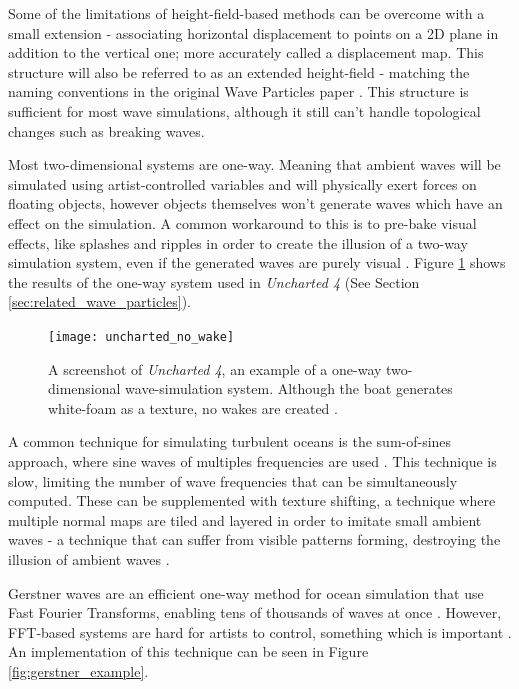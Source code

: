 \documentclass[12pt,a4paper,twoside]{report}
\begin{document}
Some of the limitations of height-field-based methods can be overcome with a
small extension - associating horizontal displacement to points on a 2D plane
in addition to the vertical one; more accurately called a displacement map.
This structure will also be referred to as an extended height-field - matching
the naming conventions in the original Wave Particles paper \cite{Yuksel2007}.
This structure is sufficient for most wave simulations, although it still can't
handle topological changes such as breaking waves.

Most two-dimensional systems are one-way. Meaning that ambient waves will be
simulated using artist-controlled variables and will physically exert forces on
floating objects, however objects themselves won't generate waves which have an
effect on the simulation. A common workaround to this is to pre-bake visual
effects, like splashes and ripples in order to create the illusion of a two-way
simulation system, even if the generated waves are purely visual \cite{RTR3}.
Figure \ref{fig:uncharted_no_wake} shows the results of the one-way system used
in \textit{Uncharted 4} (See Section \ref{sec:related_wave_particles}).

\begin{figure}[h]
\centering
\texttt{[image: uncharted\_no\_wake]}
\caption{A screenshot of \textit{Uncharted 4}, an example of a one-way
two-dimensional wave-simulation system. Although the boat generates white-foam
as a texture, no wakes are created \cite{Tatarchuk:2016:ARR:2897826.2940291}.}
\label{fig:uncharted_no_wake}
\end{figure}

A common technique for simulating turbulent oceans is the sum-of-sines
approach, where sine waves of multiples frequencies are used
\cite{GamaSutra3DWater}. This technique is slow, limiting the number of wave
frequencies that can be simultaneously computed. These can be supplemented with
texture shifting, a technique where multiple normal maps are tiled and layered
in order to imitate small ambient waves - a technique that can suffer from
visible patterns forming, destroying the illusion of ambient waves \cite{RTR3}.

Gerstner waves are an efficient one-way method for ocean simulation that use
Fast Fourier Transforms, enabling tens of thousands of waves at once
\cite{Tessendorf2001} \cite{GPUGems}. However, FFT-based systems are hard for
artists to control, something which is important
\cite{Tatarchuk:2016:ARR:2897826.2940291}. An implementation of this technique
can be seen in Figure \ref{fig:gerstner_example}.
\end{document}
